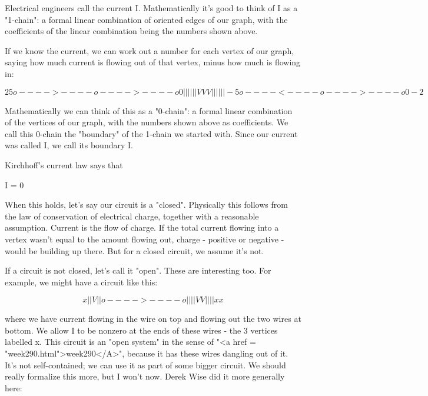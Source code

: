 Electrical engineers call the current I.  Mathematically it's good
to think of I as a "1-chain": a formal linear combination of 
oriented edges of our graph, with the coefficients of the linear combination 
being the numbers shown above.  

If we know the current, we can work out a number for each vertex of
our graph, saying how much current is flowing out of that vertex,
minus how much is flowing in:

$$
                         2     
             5 o---->----o---->----o 0 
               |         |         | 
               |         |         | 
               V         V         V 
               |         |         | 
               |         |         | 
            -5 o----<----o---->----o 0
                       -2   
$$
    

Mathematically we can think of this as a "0-chain": a formal
linear combination of the vertices of our graph, with the numbers
shown above as coefficients.  We call this 0-chain the
"boundary" of the 1-chain we started with.  Since our
current was called I, we call its boundary \delta I.

Kirchhoff's current law says that 

\delta I = 0

When this holds, let's say our circuit is a "closed".
Physically this follows from the law of conservation of electrical
charge, together with a reasonable assumption.  Current is the flow of
charge.  If the total current flowing into a vertex wasn't equal to
the amount flowing out, charge - positive or negative - would be
building up there.  But for a closed circuit, we assume it's not.

If a circuit is not closed, let's call it "open".  These are
interesting too.  For example, we might have a circuit like this:

$$
               x
               |    
               |    
               V    
               |    
               |    
               o---->----o
               |         |
               |         |
               V         V
               |         |
               |         |
               x         x         

$$
    
where we have current flowing in the wire on top and flowing out the
two wires at bottom.  We allow \delta I to be nonzero at the ends
of these wires - the 3 vertices labelled x.  This circuit is an
"open system" in the sense of "<a href =
"week290.html">week290</A>", because it has these wires dangling
out of it.  It's not self-contained; we can use it as part of some
bigger circuit.  We should really formalize this more, but I won't now.
Derek Wise did it more generally here:

